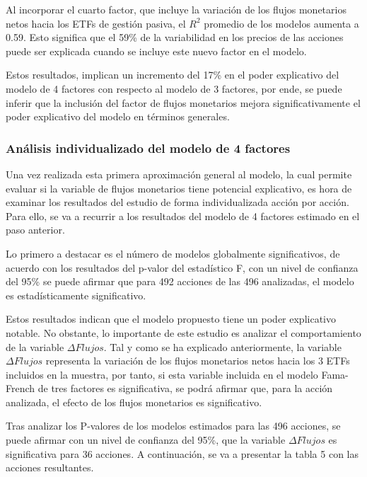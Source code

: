 \documentclass[12pt,a4paper]{article}
\begin{document}
Al incorporar el cuarto factor, que incluye la variación de los flujos monetarios netos hacia los ETFs de gestión pasiva, el $R^2$ promedio de los modelos aumenta a 0.59. Esto significa que el 59\% de la variabilidad en los precios de las acciones puede ser explicada cuando se incluye este nuevo factor en el modelo.

Estos resultados, implican un incremento del 17\% en el poder explicativo del modelo de 4 factores con respecto al modelo de 3 factores, por ende, se puede inferir que la inclusión del factor de flujos monetarios mejora significativamente el poder explicativo del modelo en términos generales.

\subsubsection*{Análisis individualizado del modelo de 4 factores}

Una vez realizada esta primera aproximación general al modelo, la cual permite evaluar si la variable de flujos monetarios tiene potencial explicativo, es hora de examinar los resultados del estudio de forma individualizada acción por acción. Para ello, se va a recurrir a los resultados del modelo de 4 factores estimado en el paso anterior.

Lo primero a destacar es el número de modelos globalmente significativos, de acuerdo con los resultados del p-valor del estadístico F, con un nivel de confianza del 95\% se puede afirmar que para 492 acciones de las 496 analizadas, el modelo es estadísticamente significativo.

Estos resultados indican que el modelo propuesto tiene un poder explicativo notable. No obstante, lo importante de este estudio es analizar el comportamiento de la variable $\Delta Flujos$. Tal y como se ha explicado anteriormente, la variable $\Delta Flujos$ representa la variación de los flujos monetarios netos hacia los 3 ETFs incluidos en la muestra, por tanto, si esta variable incluida en el modelo Fama-French de tres factores es significativa, se podrá afirmar que, para la acción analizada, el efecto de los flujos monetarios es significativo.

Tras analizar los P-valores de los modelos estimados para las 496 acciones, se puede afirmar con un nivel de confianza del 95\%, que la variable $\Delta Flujos$ es significativa para 36 acciones. A continuación, se va a presentar la tabla 5 con las acciones resultantes.
\end{document}
